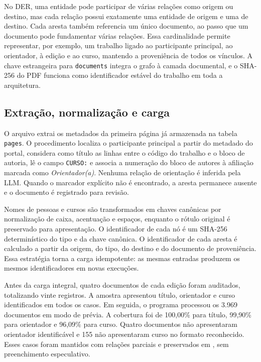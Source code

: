 No DER, uma entidade pode participar de várias relações como origem ou destino, mas cada relação possui exatamente uma entidade de origem e uma de destino. Cada aresta também referencia um único documento, ao passo que um documento pode fundamentar várias relações. Essa cardinalidade permite representar, por exemplo, um trabalho ligado ao participante principal, ao orientador, à edição e ao curso, mantendo a proveniência de todos os vínculos. A chave estrangeira para \texttt{documents} integra o grafo à camada documental, e o SHA-256 do PDF funciona como identificador estável do trabalho em toda a arquitetura.

\subsection{Extração, normalização e carga}

O arquivo  extrai os metadados da primeira página já armazenada na tabela \texttt{pages}. O procedimento localiza o participante principal a partir do metadado do portal, considera como título as linhas entre o código do trabalho e o bloco de autoria, lê o campo \texttt{CURSO:} e associa a numeração do bloco de autores à afiliação marcada como \textit{Orientador(a)}. Nenhuma relação de orientação é inferida pela LLM. Quando o marcador explícito não é encontrado, a aresta permanece ausente e o documento é registrado para revisão.

Nomes de pessoas e cursos são transformados em chaves canônicas por normalização de caixa, acentuação e espaços, enquanto o rótulo original é preservado para apresentação. O identificador de cada nó é um SHA-256 determinístico do tipo e da chave canônica. O identificador de cada aresta é calculado a partir da origem, do tipo, do destino e do documento de proveniência. Essa estratégia torna a carga idempotente: as mesmas entradas produzem os mesmos identificadores em novas execuções.

Antes da carga integral, quatro documentos de cada edição foram auditados, totalizando vinte registros. A amostra apresentou título, orientador e curso identificados em todos os casos. Em seguida, o programa  processou os 3.969 documentos em modo de prévia. A cobertura foi de 100,00\% para título, 99,90\% para orientador e 96,09\% para curso. Quatro documentos não apresentaram orientador identificável e 155 não apresentaram curso no formato reconhecido. Esses casos foram mantidos com relações parciais e preservados em , sem preenchimento especulativo.

